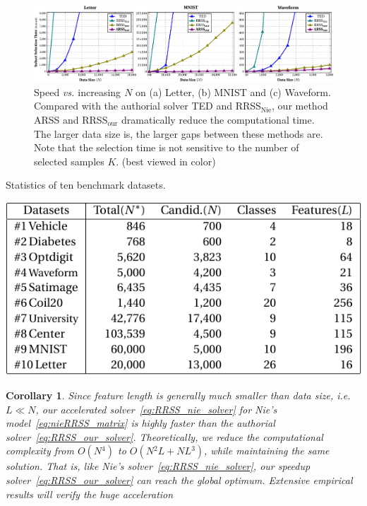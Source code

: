 \documentclass[a4paper]{article}
\newtheorem{corollary}[theorem]{Corollary}     %
\begin{document}
\begin{figure}[tb]
\centering{}\includegraphics[width=2.12\columnwidth]{1F__important_doingWork_myWorks_AAAI2015_figs_slcTime_vs_N_LetterMinistWaveform-crop.pdf}\caption{{\small{Speed }}\emph{\small{vs. }}{\small{increasing}}\emph{\small{
}}{\small{$N$ on (a) Letter, (b) MNIST and (c) Waveform. Compared
with the authorial solver TED and RRSS$_{\text{Nie}}$, our method
ARSS and RRSS$_{\text{our}}$ dramatically reduce the computational
time. The larger data size is, the larger gaps between these methods
are. Note that the selection time is not sensitive to the number of
selected samples $K$. (best viewed in color) \label{fig:Time_vs_N}}}}
\end{figure}
\begin{table}[t]
\centering{}\caption{{\small{Statistics of ten benchmark datasets.\label{tab:description10Datasets}}} }
\includegraphics[width=1\columnwidth]{2F__important_doingWork_myWorks_AAAI2015_figs_10_datasets-crop.pdf}
\end{table}
\begin{corollary} \label{corollary:RRSS_our} Since feature length
is generally much smaller than data size, i.e. $L\!\ll\! N$, our
accelerated solver\ \eqref{eq:RRSS_nie_solver} for Nie's model\ \eqref{eq:nieRRSS_matrix}
is highly faster than the authorial solver\ \eqref{eq:RRSS_our_solver}.
Theoretically, we reduce the computational complexity from $O\left(N{}^{4}\right)$
to $O\left(N{}^{2}L+NL{}^{3}\right)$, while maintaining the same
solution. That is, like Nie's solver\ \eqref{eq:RRSS_nie_solver},
our speedup solver\ \eqref{eq:RRSS_our_solver} can reach the global
optimum. Extensive empirical results will verify the huge acceleration\end{corollary} 
\end{document}
